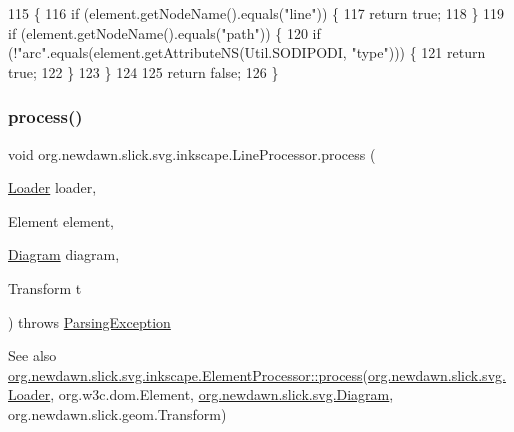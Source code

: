 \begin{DoxyCode}
115                                             \{
116         \textcolor{keywordflow}{if} (element.getNodeName().equals(\textcolor{stringliteral}{"line"})) \{
117             \textcolor{keywordflow}{return} \textcolor{keyword}{true};
118         \}
119         \textcolor{keywordflow}{if} (element.getNodeName().equals(\textcolor{stringliteral}{"path"})) \{
120             \textcolor{keywordflow}{if} (!\textcolor{stringliteral}{"arc"}.equals(element.getAttributeNS(Util.SODIPODI, \textcolor{stringliteral}{"type"}))) \{
121                 \textcolor{keywordflow}{return} \textcolor{keyword}{true};
122             \}
123         \}
124         
125         \textcolor{keywordflow}{return} \textcolor{keyword}{false};
126     \}
\end{DoxyCode}
\mbox{\label{classorg_1_1newdawn_1_1slick_1_1svg_1_1inkscape_1_1_line_processor_a709d0be1a74b032aa4646f3a51a52657}} 
\subsubsection{\texorpdfstring{process()}{process()}}
{\footnotesize\ttfamily void org.\+newdawn.\+slick.\+svg.\+inkscape.\+Line\+Processor.\+process (\begin{DoxyParamCaption}\item[{\mbox{\hyperlink{interfaceorg_1_1newdawn_1_1slick_1_1svg_1_1_loader}{Loader}}}]{loader,  }\item[{Element}]{element,  }\item[{\mbox{\hyperlink{classorg_1_1newdawn_1_1slick_1_1svg_1_1_diagram}{Diagram}}}]{diagram,  }\item[{Transform}]{t }\end{DoxyParamCaption}) throws \mbox{\hyperlink{classorg_1_1newdawn_1_1slick_1_1svg_1_1_parsing_exception}{Parsing\+Exception}}\hspace{0.3cm}{\ttfamily [inline]}}

\begin{DoxySeeAlso}{See also}
\mbox{\hyperlink{interfaceorg_1_1newdawn_1_1slick_1_1svg_1_1inkscape_1_1_element_processor_acd170a9e1119481edae885780db59a2e}{org.\+newdawn.\+slick.\+svg.\+inkscape.\+Element\+Processor\+::process}}(\mbox{\hyperlink{interfaceorg_1_1newdawn_1_1slick_1_1svg_1_1_loader}{org.\+newdawn.\+slick.\+svg.\+Loader}}, org.\+w3c.\+dom.\+Element, \mbox{\hyperlink{classorg_1_1newdawn_1_1slick_1_1svg_1_1_diagram}{org.\+newdawn.\+slick.\+svg.\+Diagram}}, org.\+newdawn.\+slick.\+geom.\+Transform) 
\end{DoxySeeAlso}



